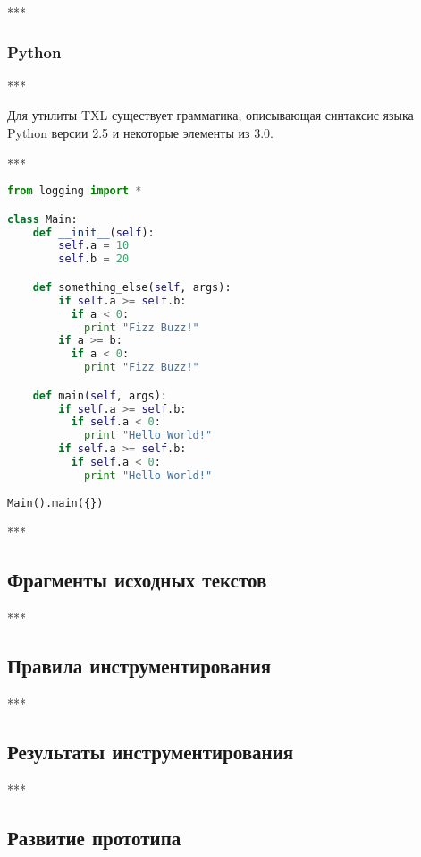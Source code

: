 ***

\subsubsection{Python}

***

Для утилиты TXL существует грамматика, описывающая синтаксис языка Python версии 2.5 и некоторые элементы из 3.0.

***

\begin{lstlisting}[frame=single, language=Python, label={test-python}, caption={Исходный текст тестового приложения.}]
from logging import *

class Main:
    def __init__(self):
        self.a = 10
        self.b = 20

    def something_else(self, args):
        if self.a >= self.b:
          if a < 0:
            print "Fizz Buzz!"
        if a >= b:
          if a < 0:
            print "Fizz Buzz!"

    def main(self, args):
        if self.a >= self.b:
          if self.a < 0:
            print "Hello World!"
        if self.a >= self.b:
          if self.a < 0:
            print "Hello World!"

Main().main({})
\end{lstlisting}

***

\subsection{Фрагменты исходных текстов}

***

\subsection{Правила инструментирования}

***

\subsection{Результаты инструментирования}

***

\subsection{Развитие прототипа}

